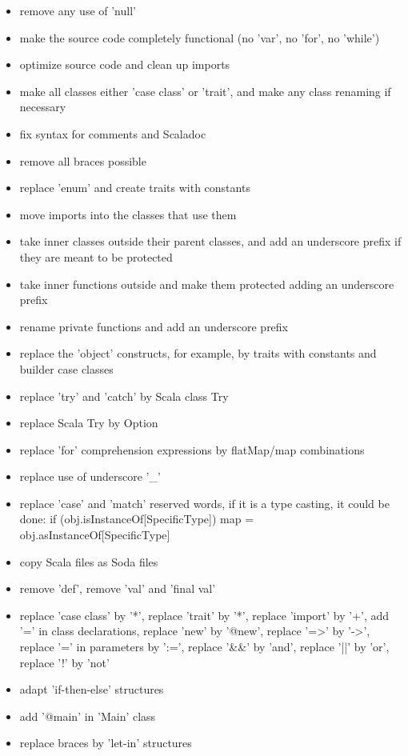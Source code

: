 \begin{itemize}
    \item remove any use of 'null'
    \item make the source code completely functional (no 'var', no 'for', no 'while')
    \item optimize source code and clean up imports
    \item make all classes either 'case class' or 'trait', and make any class renaming if necessary
    \item fix syntax for comments and Scaladoc
    \item remove all braces possible
    \item replace 'enum' and create traits with constants
    \item move imports into the classes that use them
    \item take inner classes outside their parent classes, and add an underscore prefix if they are meant to be protected
    \item take inner functions outside and make them protected adding an underscore prefix
    \item rename private functions and add an underscore prefix
    \item replace the 'object' constructs, for example, by traits with constants and builder case classes
    \item replace 'try' and 'catch' by Scala class Try
    \item replace Scala Try by Option
    \item replace 'for' comprehension expressions by flatMap/map combinations
    \item replace use of underscore '\_'
    \item replace 'case' and 'match' reserved words, if it is a type casting, it could be done:
    if (obj.isInstanceOf[SpecificType]) {
        map = obj.asInstanceOf[SpecificType]
    }
    \item copy Scala files as Soda files
    \item remove 'def', remove 'val' and 'final val'
    \item replace 'case class' by '*', replace 'trait' by '*', replace 'import' by '+', add '=' in class declarations,
    replace 'new' by '@new', replace '=>' by '->', replace '=' in parameters by ':=',
    replace '\&\&' by 'and', replace '||' by 'or', replace '!' by 'not'
    \item adapt 'if-then-else' structures
    \item add '@main' in 'Main' class
    \item replace braces by 'let-in' structures
\end{itemize}

